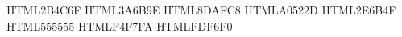 \usepackage[dvipsnames,svgnames,x11names]{xcolor}

\definecolor{Ortyx@rule}      {HTML}{2B4C6F}  %
\definecolor{Ortyx@accent}    {HTML}{3A6B9E}  %
\definecolor{Ortyx@subtle}    {HTML}{8DAFC8}  %
\definecolor{Ortyx@warn}      {HTML}{A0522D}  %
\definecolor{Ortyx@salvage}   {HTML}{2E6B4F}  %
\definecolor{Ortyx@neutral}   {HTML}{555555}  %
\definecolor{Ortyx@box@bg}    {HTML}{F4F7FA}  %
\definecolor{Ortyx@warn@bg}   {HTML}{FDF6F0}  %
